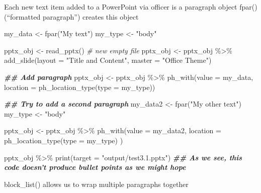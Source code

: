 \documentclass[
]{book}
\newenvironment{Shaded}{\begin{snugshade}}{\end{snugshade}}
\newcommand{\AttributeTok}[1]{\textcolor[rgb]{0.77,0.63,0.00}{#1}}
\newcommand{\CommentTok}[1]{\textcolor[rgb]{0.56,0.35,0.01}{\textit{#1}}}
\newcommand{\DocumentationTok}[1]{\textcolor[rgb]{0.56,0.35,0.01}{\textbf{\textit{#1}}}}
\newcommand{\FunctionTok}[1]{\textcolor[rgb]{0.00,0.00,0.00}{#1}}
\newcommand{\NormalTok}[1]{#1}
\newcommand{\OtherTok}[1]{\textcolor[rgb]{0.56,0.35,0.01}{#1}}
\newcommand{\SpecialCharTok}[1]{\textcolor[rgb]{0.00,0.00,0.00}{#1}}
\newcommand{\StringTok}[1]{\textcolor[rgb]{0.31,0.60,0.02}{#1}}
\begin{document}
Each new text item added to a PowerPoint via officer is a paragraph object
fpar() (``formatted paragraph'') creates this object

\begin{Shaded}
\begin{Highlighting}[]
\NormalTok{my\_data }\OtherTok{\textless{}{-}} \FunctionTok{fpar}\NormalTok{(}\StringTok{"My text"}\NormalTok{)}
\NormalTok{my\_type }\OtherTok{\textless{}{-}} \StringTok{"body"}

\NormalTok{pptx\_obj }\OtherTok{\textless{}{-}} \FunctionTok{read\_pptx}\NormalTok{() }\CommentTok{\# new empty file}
\NormalTok{pptx\_obj }\OtherTok{\textless{}{-}}\NormalTok{ pptx\_obj }\SpecialCharTok{\%\textgreater{}\%} 
  \FunctionTok{add\_slide}\NormalTok{(}\AttributeTok{layout =} \StringTok{"Title and Content"}\NormalTok{, }\AttributeTok{master =} \StringTok{"Office Theme"}\NormalTok{)}

\DocumentationTok{\#\# Add paragraph}
\NormalTok{pptx\_obj }\OtherTok{\textless{}{-}}\NormalTok{ pptx\_obj }\SpecialCharTok{\%\textgreater{}\%} 
  \FunctionTok{ph\_with}\NormalTok{(}\AttributeTok{value =}\NormalTok{ my\_data, }\AttributeTok{location =} \FunctionTok{ph\_location\_type}\NormalTok{(}\AttributeTok{type =}\NormalTok{ my\_type))}

\DocumentationTok{\#\# Try to add a second paragraph}
\NormalTok{my\_data2 }\OtherTok{\textless{}{-}} \FunctionTok{fpar}\NormalTok{(}\StringTok{"My other text"}\NormalTok{)}
\NormalTok{my\_type }\OtherTok{\textless{}{-}} \StringTok{"body"}

\NormalTok{pptx\_obj }\OtherTok{\textless{}{-}}\NormalTok{ pptx\_obj }\SpecialCharTok{\%\textgreater{}\%} 
  \FunctionTok{ph\_with}\NormalTok{(}\AttributeTok{value =}\NormalTok{ my\_data2, }\AttributeTok{location =} \FunctionTok{ph\_location\_type}\NormalTok{(}\AttributeTok{type =}\NormalTok{ my\_type) )}

\NormalTok{pptx\_obj }\SpecialCharTok{\%\textgreater{}\%}
  \FunctionTok{print}\NormalTok{(}\AttributeTok{target =} \StringTok{"output/test3.1.pptx"}\NormalTok{) }
\DocumentationTok{\#\# As we see, this code doesn’t produce bullet points as we might hope}
\end{Highlighting}
\end{Shaded}

block\_list() allows us to wrap multiple paragraphs together
\end{document}
